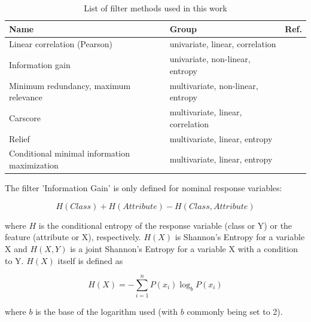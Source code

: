 \documentclass[journal]{IEEEtran}
\begin{document}
\begin{table}[b!]
	\centering
	\caption{List of filter methods used in this work}
	\label{tab:filter-methods}
	\begingroup\footnotesize
	\begin{adjustbox}{width={0.48\textwidth},totalheight={\textheight},keepaspectratio}
		\begin{tabular}{lll}
			\\
			Name                                         & Group                             & Ref.               \\
			\toprule
			Linear correlation (Pearson)                 & univariate, linear, correlation   & \cite{pearson1901} \\
			Information gain                             & univariate, non-linear, entropy   & \cite{quinlan1986} \\
			Minimum redundancy, maximum relevance        & multivariate, non-linear, entropy & \cite{zhao2013}    \\
			Carscore                                     & multivariate, linear, correlation & \cite{zuber2011}   \\
			Relief                                       & multivariate, linear, entropy     & \cite{kira1992}    \\
			Conditional minimal information maximization & multivariate, linear, entropy     & \cite{fleuret2004}
		\end{tabular}
	\end{adjustbox}
	\endgroup
\end{table}

The filter 'Information Gain' is only defined for nominal response variables:

\begin{equation}
	H(Class) + H(Attribute) - H(Class, Attribute)
\end{equation}

where \(H\) is the conditional entropy of the response variable (class or Y) or the feature (attribute or X), respectively.
$H(X)$ is Shannon's Entropy \cite{shannon1948} for a variable X and $H(X, Y)$ is a joint Shannon's Entropy for a variable X with a condition to Y.
$H(X)$ itself is defined as

\begin{equation}
	H(X) = - \sum_{i=1}^{n} P(x_i)\log_bP(x_i)
\end{equation}

where $b$ is the base of the logarithm used (with $b$ commonly being set to 2).
\end{document}
